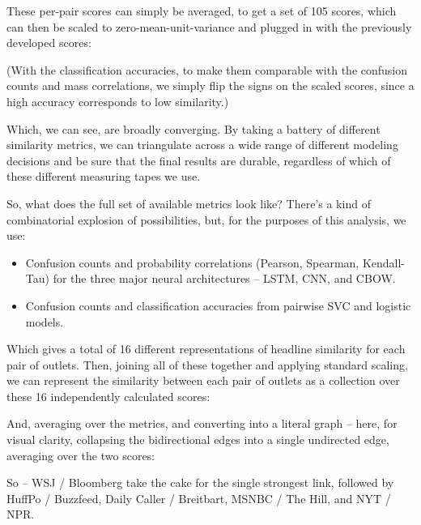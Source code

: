 \documentclass{scrartcl}
\begin{document}

These per-pair scores can simply be averaged, to get a set of 105 scores, which can then be scaled to zero-mean-unit-variance and plugged in with the previously developed scores:


(With the classification accuracies, to make them comparable with the confusion counts and mass correlations, we simply flip the signs on the scaled scores, since a high accuracy corresponds to low similarity.)

Which, we can see, are broadly converging. By taking a battery of different similarity metrics, we can triangulate across a wide range of different modeling decisions and be sure that the final results are durable, regardless of which of these different measuring tapes we use.

So, what does the full set of available metrics look like? There's a kind of combinatorial explosion of possibilities, but, for the purposes of this analysis, we use:

\begin{itemize}
\item Confusion counts and probability correlations (Pearson, Spearman, Kendall-Tau) for the three major neural architectures -- LSTM, CNN, and CBOW.
\item Confusion counts and classification accuracies from pairwise SVC and logistic models.
\end{itemize}

Which gives a total of 16 different representations of headline similarity for each pair of outlets. Then, joining all of these together and applying standard scaling, we can represent the similarity between each pair of outlets as a collection over these 16 independently calculated scores:


And, averaging over the metrics, and converting into a literal graph -- here, for visual clarity, collapsing the bidirectional edges into a single undirected edge, averaging over the two scores:


So -- WSJ / Bloomberg take the cake for the single strongest link, followed by HuffPo / Buzzfeed, Daily Caller / Breitbart, MSNBC / The Hill, and NYT / NPR.
\end{document}
